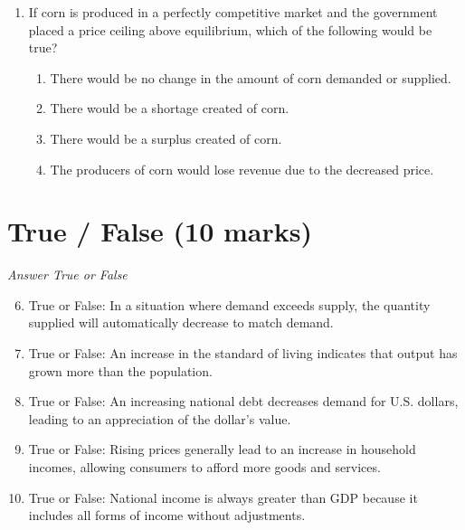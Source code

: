 \documentclass[12pt]{article}
\begin{document}
\begin{enumerate}[label=\arabic*.]
\begin{enumerate}[label=(\alph*)]
    \item Demand is downward-sloping.
    \item The demand curve lies above the marginal revenue curve.
    \item Price is determined by the equilibrium in the entire market.
    \item Average revenue differs from price.
\end{enumerate}
\item If corn is produced in a perfectly competitive market and the government placed a price ceiling above equilibrium, which of the following would be true?
\begin{enumerate}[label=(\alph*)]
    \item There would be no change in the amount of corn demanded or supplied.
    \item There would be a shortage created of corn.
    \item There would be a surplus created of corn.
    \item The producers of corn would lose revenue due to the decreased price.
\end{enumerate}
\end{enumerate}

\section*{True / False (10 marks)}
\textit{Answer True or False}
\begin{enumerate}[label=\arabic*.]
\setcounter{enumi}{5}
\item True or False: In a situation where demand exceeds supply, the quantity supplied will automatically decrease to match demand.
\item True or False: An increase in the standard of living indicates that output has grown more than the population.
\item True or False: An increasing national debt decreases demand for U.S. dollars, leading to an appreciation of the dollar's value.
\item True or False: Rising prices generally lead to an increase in household incomes, allowing consumers to afford more goods and services.
\item True or False: National income is always greater than GDP because it includes all forms of income without adjustments.
\end{enumerate}
\end{document}
